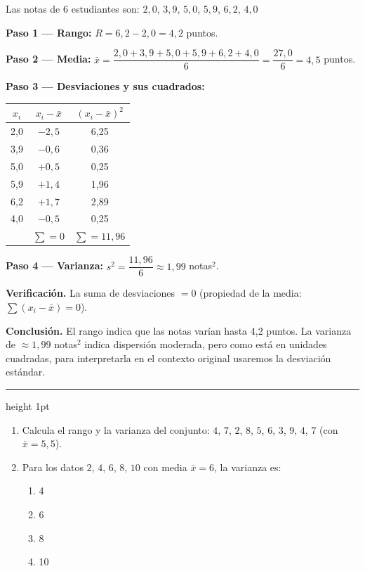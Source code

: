 \documentclass[11pt, letterpaper]{article}
\newcommand{\subbloque}[1]{%
  \vspace{14pt}
  \noindent{\large\bfseries\color{zenitnavy} #1}\par
  \vspace{4pt}\hrule height 1pt\vspace{8pt}}
\begin{document}
\begin{tcolorbox}[examplebox, title={Ej. 11. Cálculo de rango y varianza}]
Las notas de 6 estudiantes son: $2{,}0$, $3{,}9$, $5{,}0$, $5{,}9$, $6{,}2$, $4{,}0$

\textbf{Paso 1 --- Rango:} $R = 6{,}2 - 2{,}0 = 4{,}2$ puntos.
\medskip

\textbf{Paso 2 --- Media:} $\bar{x} = \dfrac{2{,}0 + 3{,}9 + 5{,}0 + 5{,}9 + 6{,}2 + 4{,}0}{6} = \dfrac{27{,}0}{6} = 4{,}5$ puntos.
\medskip

\textbf{Paso 3 --- Desviaciones y sus cuadrados:}
  \begin{center}
  \renewcommand{\arraystretch}{1.2}
  \begin{tabular}{c c c}
  \toprule
  $x_i$ & $x_i - \bar{x}$ & $(x_i - \bar{x})^2$\\
  \midrule
  2{,}0 & $-2{,}5$ & 6{,}25\\
  3{,}9 & $-0{,}6$ & 0{,}36\\
  5{,}0 & $+0{,}5$ & 0{,}25\\
  5{,}9 & $+1{,}4$ & 1{,}96\\
  6{,}2 & $+1{,}7$ & 2{,}89\\
  4{,}0 & $-0{,}5$ & 0{,}25\\
  \midrule
  & $\sum = 0$ & $\sum = 11{,}96$\\
  \bottomrule
  \end{tabular}
  \end{center}
\medskip

\textbf{Paso 4 --- Varianza:} $s^2 = \dfrac{11{,}96}{6} \approx 1{,}99$ notas$^2$.
\medskip

\noindent\textbf{Verificación.} La suma de desviaciones $= 0$ \checkmark (propiedad de la media: $\sum(x_i-\bar{x})=0$).
\medskip

\noindent\textbf{Conclusión.} El rango indica que las notas varían hasta 4{,}2 puntos. La varianza de $\approx1{,}99$ notas$^2$ indica dispersión moderada, pero como está en unidades cuadradas, para interpretarla en el contexto original usaremos la desviación estándar.

\end{tcolorbox}

\subbloque{Práctica inmediata 6.1}

\begin{enumerate}[label=\textbf{\arabic*.}, leftmargin=*]
  \item Calcula el rango y la varianza del conjunto: $4$, $7$, $2$, $8$, $5$, $6$, $3$, $9$, $4$, $7$ \quad (con $\bar{x} = 5{,}5$).

  \item Para los datos $2$, $4$, $6$, $8$, $10$ con media $\bar{x} = 6$, la varianza es:
  \begin{enumerate}[label=\Alph*),leftmargin=14pt]
    \item 4
    \item 6
    \item 8
    \item 10
  
\vspace{3.2cm}
\end{enumerate}
\end{enumerate}
\end{document}
